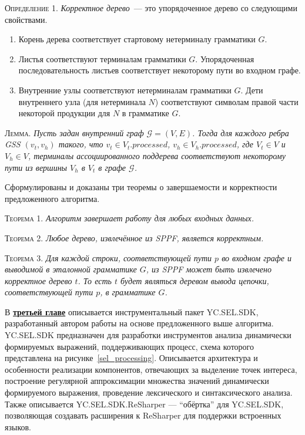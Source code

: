 \textsc{Определение 1.} 
\emph{Корректное дерево}~--- это упорядоченное дерево со следующими свойствами.
\begin{enumerate}
  \item Корень дерева соответствует стартовому нетерминалу грамматики $G$.
  \item Листья соответствуют терминалам грамматики $G$. Упорядоченная последовательность листьев соответствует некоторому пути во входном графе.
  \item Внутренние узлы соответствуют нетерминалам грамматики $G$. Дети внутреннего узла (для нетерминала $N$) соответствуют символам правой части некоторой продукции для $N$ в грамматике $G$.
\end{enumerate}

\textsc{Лемма.}
\textit{Пусть задан внутренний граф $\mathcal{G}=(V,E)$. Тогда для каждого ребра GSS $(v_{t}, v_{h})$ такого, что $v_{t} \in V_{t}.processed$, $v_{h} \in V_{h}.processed$, где $V_{t} \in V$ и $V_{h} \in V$, терминалы ассоциированного поддерева соответствуют некоторому пути из вершины $V_{h}$ в $V_{t}$ в графе $\mathcal{G}$.}

\vspace{10pt}

Сформулированы и доказаны три теоремы о завершаемости и корректности предложенного алгоритма.

\vspace{5pt}

\textsc{Теорема 1.} 
\textit{Алгоритм завершает работу для любых входных данных.}

\vspace{10pt}

\textsc{Теорема 2.} 
\textit{Любое дерево, извлечённое из SPPF, является корректным.}

\vspace{10pt}

\textsc{Теорема 3.} 
\textit{Для каждой строки, соответствующей пути $p$ во входном графе и выводимой в эталонной грамматике $G$, из SPPF может быть извлечено корректное дерево $t$. То есть $t$ будет являться деревом вывода цепочки, соответствующей пути $p$, в грамматике $G$.}

\vspace{10pt}

В \underline{\textbf{третьей главе}}  описывается инструментальный пакет YC.SEL.SDK, разработанный автором работы на основе предложенного выше алгоритма. YC.SEL.SDK предназначен для разработки 
инструментов анализа динамически формируемых выражений, поддерживающих процесс, схема которого представлена на рисунке~\ref{sel_processing}. Описывается архитектура и особенности реализации компонентов, отвечающих за выделение точек интереса, 
 построение регулярной аппроксимации множества значений динамически формируемого выражения, проведение лексического и синтаксического анализа. Также описывается YC.SEL.SDK.ReSharper --- ``обёртка'' для YC.SEL.SDK, позволяющая создавать расширения к ReSharper для поддержки встроенных языков.

